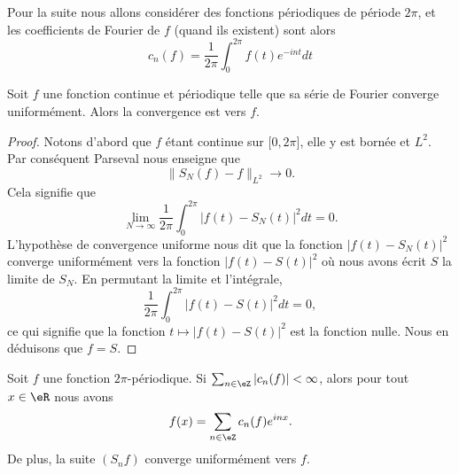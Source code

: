 Pour la suite nous allons considérer des fonctions périodiques de période \( 2\pi\), et les coefficients de Fourier de \( f\) (quand ils existent) sont alors
\begin{equation}    \label{EqNDBaXRL}
    c_n(f)=\frac{1}{ 2\pi }\int_0^{2\pi}f(t) e^{-int}dt
\end{equation}

\begin{proposition}  \label{PropmrLfGt}
    Soit \( f\) une fonction continue et périodique telle que sa série de Fourier converge uniformément. Alors la convergence est vers \( f\).
\end{proposition}

\begin{proof}
    Notons d'abord que \( f\) étant continue sur \(\mathopen[ 0 , 2\pi \mathclose]\), elle y est bornée et \( L^2\). Par conséquent Parseval nous enseigne que
    \begin{equation}
        \| S_N(f)-f \|_{L^2}\to 0.
    \end{equation}
    Cela signifie que
    \begin{equation}
        \lim_{N\to \infty} \frac{1}{ 2\pi }\int_{0}^{2\pi}| f(t)-S_N(t) |^2dt=0.
    \end{equation}
    L'hypothèse de convergence uniforme nous dit que la fonction \( | f(t)-S_N(t) |^2\) converge uniformément vers la fonction \( | f(t)-S(t) |^2\) où nous avons écrit \( S\) la limite de \( S_N\). En permutant la limite et l'intégrale,
    \begin{equation}
        \frac{1}{ 2\pi }\int_0^{2\pi}| f(t)-S(t) |^2dt=0,
    \end{equation}
    ce qui signifie que la fonction \( t\mapsto | f(t)-S(t) |^2\) est la fonction nulle. Nous en déduisons que \( f=S\).
\end{proof}

\begin{proposition}     \label{PropSgvPab}
    Soit \( f\) une fonction \( 2\pi\)-périodique. Si \( \sum_{n\in \eZ}| c_n(f) |<\infty\), alors pour tout \( x\in \eR\) nous avons
    \begin{equation}
        f(x)=\sum_{n\in \eZ}c_n(f) e^{inx}.
    \end{equation}
    De plus, la suite \( (S_nf)\) converge uniformément vers \( f\).
\end{proposition}

